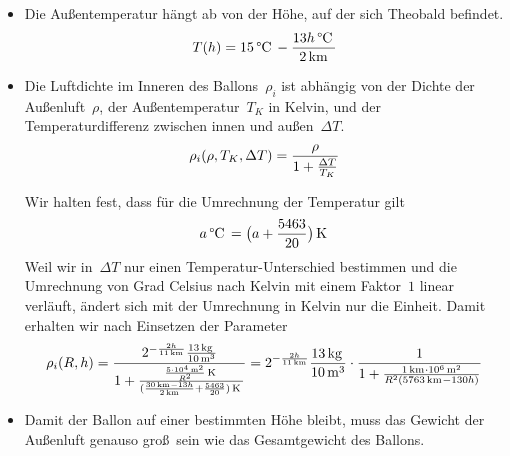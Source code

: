 \documentclass[../full]{subfiles}
\newcommand\Unit[2][\,]{
    \, \mathrm{#2}^{#1}
}
\newcommand\kg{\Unit{kg}}
\newcommand\m[1][]{\Unit[#1]{m}}
\newcommand\km[1][]{\Unit[#1]{km}}
\newcommand\Celsius{\Unit{\degree C}}
\newcommand\Kelvin{\Unit{K}}
\begin{document}
\begin{itemize}
        \item
        Die Au\ss entemperatur h\"angt ab von der H\"ohe,
        auf der sich Theobald befindet.
        \begin{equation*}
            T \paren{h} = 15 \Celsius - \frac{13h \Celsius}{2 \km}
        \end{equation*}

        \item
        Die Luftdichte im Inneren des Ballons~\( \rho_i \)
        ist abh\"angig von der Dichte der Au\ss enluft~\( \rho \),
        der Au\ss entemperatur~\( T_K \) in Kelvin,
        und der Temperaturdifferenz zwischen innen und au\ss en~\( \Delta T \).
        \begin{equation*}
            \rho_i \lparen\rho, T_K, \Delta T\rparen
            = \frac{\rho}{1 + \frac{\Delta T}{T_K}}
        \end{equation*}

        Wir halten fest, dass f\"ur die Umrechnung der Temperatur gilt
        \begin{equation*}
            a \Celsius = \paren[\big]{a + \frac{5463}{20}} \Kelvin
        \end{equation*}
        Weil wir in~\( \Delta T \) nur einen Temperatur-Unterschied bestimmen
        und die Umrechnung von Grad Celsius nach Kelvin
        mit einem Faktor~\( 1 \) linear verl\"auft,
        \"andert sich mit der Umrechnung in Kelvin nur die Einheit.
        Damit erhalten wir nach Einsetzen der Parameter
        \begin{equation*}
            \rho_i \paren{R, h}
            = \frac
                {2^{-\frac{2h}{11 \km}} \frac{13 \kg}{10 \m[3]}}
                {
                    1 + \frac
                        {\frac{5 \cdot 10^4 \m[2]}{R^2} \Kelvin}
                        {
                            \paren{
                                \frac{30 \km - 13h}{2 \km} + \frac{5463}{20}
                            } \Kelvin
                        }
                }
            = 2^{-\frac{2h}{11 \km}} \frac{13 \kg}{10 \m[3]}
                \cdot \frac
                    {1}
                    {
                        1 + \frac
                            {1 \km \cdot 10^6 \m[2]}
                            {R^2 \paren{5763 \km - 130h}}
                    }
        \end{equation*}

        \item
        Damit der Ballon auf einer bestimmten H\"ohe bleibt,
        muss das Gewicht der Au\ss enluft
        genauso gro\ss\ sein wie das Gesamtgewicht des Ballons.
    \end{itemize}
\end{document}
